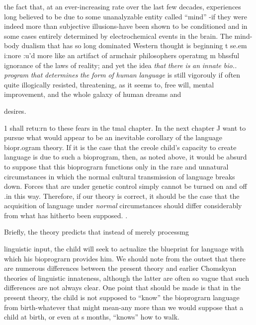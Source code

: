 the fact that, at an ever-increasing rate over the last few decades, experi\-ences long believed to be due to some unanalyzable entity called ``mind'' {}-if they were indeed more than subjective illusions{}-have been shown to be conditioned and in some cases entirely determined by electrochemical events in the brain. The mind-body dualism that has so long dominated Western thought is beginning t se.em i:nore :u'd more like an artifact of armchair philosophers operatmg m bhssful ignorance of the laws of reality; and yet the idea \textit{that} \textit{there} \textit{is} \textit{an} \textit{innate} \textit{bio}\textit{..} \textit{program} \textit{that} \textit{determines} \textit{the} \textit{form} \textit{of} \textit{human} \textit{language} is still vigorouly if often quite illogically resisted, threatening, as it seems to, free will, mental improvement, and the whole galaxy of human dreams and

desires.

1 shall retu:rn to these fears in the tmal chapter. In the next chapter J want to pursue what would appear to be an inevitable corol\-lary of the language biopr.ogram theory. If it is the case that the creole child's capacity to create language is due to such a bioprogram, then, as noted above, it would be absurd to suppose that this bioprograrn functions only in the rare and unnatural circumstances in which the normal cultural transmission of language breaks down. Forces that are under genetic control simply cannot be turned on and off .in this way. Therefore, if our theory is correct, it should be the case that the acquisition of language under \textit{normal} circumstances should differ considerably from what has hitherto been supposed. .

Briefly, the theory predicts that instead of merely processmg

linguistic input, the child will seek to actualize the blueprint for lan\-guage with which his bioprograrn provides him. We should note from the outset that there are numerous differences between the present theory and earlier Chomskyan theories of linguistic innateness, al\-though the latter are often so vague that such differences are not always clear. One point that should be made is that in the present theory, the child is not supposed to ``know'' the bioprograrn language from birth-whatever that might mean-any more than we would suppose that a child at birth, or even at s months, ``knows'' how to walk.


